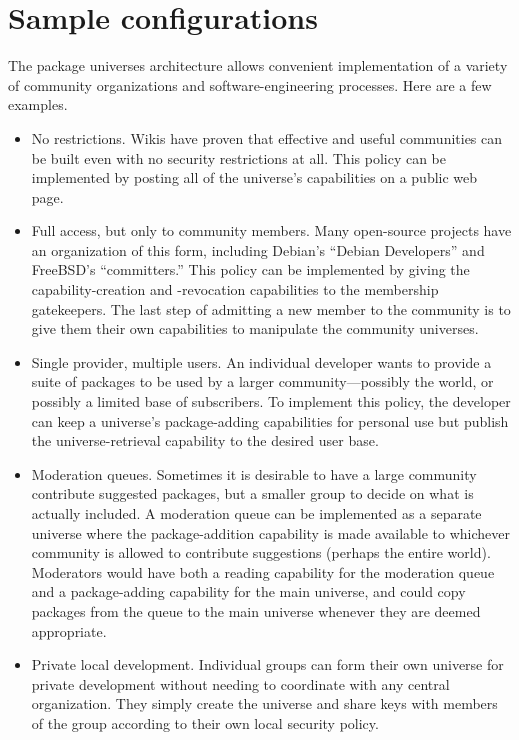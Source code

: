 \documentclass{article}
\begin{document}
\section{Sample configurations}
The package universes architecture allows convenient implementation of
a variety of community organizations and software-engineering
processes.  Here are a few examples.
\begin{itemize}
\item No restrictions.  Wikis have proven that effective and useful
      communities can be built even with no security restrictions at
      all.  This policy can be implemented by posting all of the
      universe's capabilities on a public web page.

\item Full access, but only to community members.  Many open-source
      projects have an organization of this form, including Debian's
      ``Debian Developers'' and FreeBSD's ``committers.''  This policy
      can be implemented by giving the capability-creation and
      -revocation capabilities to the membership gatekeepers.
      The last step of admitting a new member to the community is to
      give them their own capabilities to manipulate the community
      universes.

\item Single provider, multiple users.  An individual developer wants
      to provide a suite of packages to be used by a larger
      community---possibly the world, or possibly a limited base of
      subscribers.  To implement this policy, the developer can keep a
      universe's package-adding capabilities for personal use but
      publish the universe-retrieval capability to the desired
      user base.

\item Moderation queues.  Sometimes it is desirable to have a large
      community contribute suggested packages, but a smaller group to
      decide on what is actually included.  A moderation queue can be
      implemented as a separate universe where the package-addition
      capability is made available to whichever community is allowed
      to contribute suggestions (perhaps the entire world).
      Moderators would have both a reading capability for the
      moderation queue and a package-adding capability for the main
      universe, and could copy packages from the queue to the main
      universe whenever they are deemed appropriate.


\item Private local development.  Individual groups can form their own
      universe for private development without needing to coordinate
      with any central organization.  They simply create the universe
      and share keys with members of the group according to their
      own local security policy.


\end{itemize}
\end{document}
